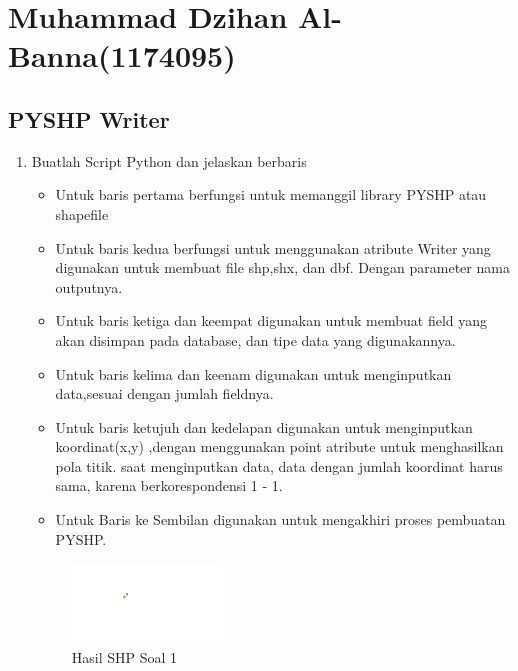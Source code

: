 \section{Muhammad Dzihan Al-Banna(1174095)}
\subsection{PYSHP Writer}
\begin{enumerate}
	\item Buatlah Script Python dan jelaskan berbaris
	
	\begin{itemize}
		\item Untuk baris pertama berfungsi untuk memanggil library PYSHP atau shapefile
		\item Untuk baris kedua berfungsi untuk menggunakan atribute Writer yang digunakan untuk membuat file shp,shx, dan dbf. Dengan parameter nama outputnya.
		\item Untuk baris ketiga dan keempat digunakan untuk membuat field yang akan disimpan pada database, dan tipe data yang digunakannya.
		\item Untuk baris kelima dan keenam digunakan untuk menginputkan data,sesuai dengan jumlah fieldnya.
		\item Untuk baris ketujuh dan kedelapan digunakan untuk menginputkan koordinat(x,y) ,dengan menggunakan point atribute untuk menghasilkan pola titik. \hfill\break
		saat menginputkan data, data dengan jumlah koordinat harus sama, karena berkorespondensi 1 - 1.
		\item Untuk Baris ke Sembilan digunakan untuk mengakhiri proses pembuatan PYSHP.
	\end{itemize}
	\hfill\break
	\begin{figure}[H]
		\includegraphics[width=4cm]{figures/1174095/2/1.png}
		\centering
		\caption{Hasil SHP Soal 1}
	\end{figure}


\end{enumerate}
